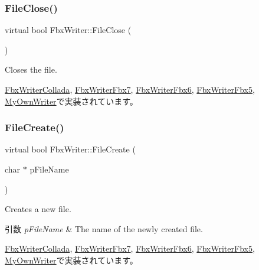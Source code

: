 \subsubsection{\texorpdfstring{File\+Close()}{FileClose()}}
{\footnotesize\ttfamily virtual bool Fbx\+Writer\+::\+File\+Close (\begin{DoxyParamCaption}{ }\end{DoxyParamCaption})\hspace{0.3cm}{\ttfamily [pure virtual]}}

Closes the file. 

\hyperlink{class_fbx_writer_collada_ae33b59a7bdbd04cca55a4632c7204f5e}{Fbx\+Writer\+Collada}, \hyperlink{class_fbx_writer_fbx7_aba83cb046ac5f4154443bdf3bd1503c0}{Fbx\+Writer\+Fbx7}, \hyperlink{class_fbx_writer_fbx6_a936f95dcb66f93ebd4ae2e8d8a0339b6}{Fbx\+Writer\+Fbx6}, \hyperlink{class_fbx_writer_fbx5_aa6731501c4006f1d4d18c32cea32e6c5}{Fbx\+Writer\+Fbx5}, \hyperlink{class_my_own_writer_a9f834f1899e95c41291188819241df4b}{My\+Own\+Writer}で実装されています。

\mbox{\label{class_fbx_writer_abe6729227cd6e3be5ee3ab0c1b8b0eda}} 
\subsubsection{\texorpdfstring{File\+Create()}{FileCreate()}\hspace{0.1cm}{\footnotesize\ttfamily [1/2]}}
{\footnotesize\ttfamily virtual bool Fbx\+Writer\+::\+File\+Create (\begin{DoxyParamCaption}\item[{char $\ast$}]{p\+File\+Name }\end{DoxyParamCaption})\hspace{0.3cm}{\ttfamily [pure virtual]}}

Creates a new file. 
\begin{DoxyParams}{引数}
{\em p\+File\+Name} & The name of the newly created file. \\
\hline
\end{DoxyParams}


\hyperlink{class_fbx_writer_collada_a973e285681d8486e74a200812eeee70a}{Fbx\+Writer\+Collada}, \hyperlink{class_fbx_writer_fbx7_ab76d4fdd92efb2a6506bde058bfde28e}{Fbx\+Writer\+Fbx7}, \hyperlink{class_fbx_writer_fbx6_ae7ad665b515f5896f2263cce0e5f38fc}{Fbx\+Writer\+Fbx6}, \hyperlink{class_fbx_writer_fbx5_a8abe68065893c971afb6b01bffc6bcaf}{Fbx\+Writer\+Fbx5}, \hyperlink{class_my_own_writer_aa30bedb6fc76d76b2199143b208161b1}{My\+Own\+Writer}で実装されています。

